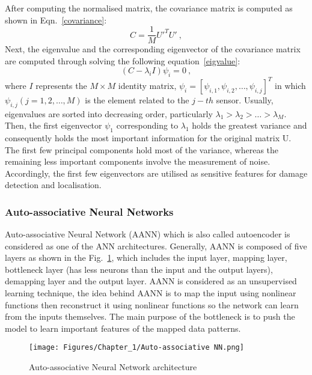 After computing the normalised matrix, the covariance matrix is computed as shown in Eqn.~\ref{covariance}:
\begin{equation}
	C = \frac{1}{M}U'^TU' \ ,
	\label{covariance}
\end{equation}
Next, the eigenvalue and the corresponding eigenvector of the covariance matrix are computed through solving the following equation~\ref{eigvalue}:
\begin{equation}
	(C-\lambda_iI)\psi_i =0 \ ,
	\label{eigvalue}
\end{equation}
where \(I\) represents the \(M\times M\) identity matrix, \(\psi_i = [\psi_{i,1},\psi_{i,2}, \hdots, \psi_{i,j}]^T\) in which \(\psi_{i,j}(j=1, 2, \hdots, M)\) is the element related to the \(j-th\) sensor.
Usually, eigenvalues are sorted into decreasing order, particularly \(\lambda_1>\lambda_2>\hdots>\lambda_M\). 
Then, the first eigenvector \(\psi_1\) corresponding to \(\lambda_1\) holds the greatest variance and consequently holds the most important information for the original matrix U. 
The first few principal components hold most of the variance, whereas the remaining less important components involve the measurement of noise.
Accordingly, the first few eigenvectors are utilised as sensitive features for damage detection and localisation.
\subsubsection{Auto-associative Neural Networks}
Auto-associative Neural Network (AANN) which is also called autoencoder is considered as one of the ANN architectures. 
Generally, AANN is composed of five layers as shown in the Fig.~\ref{fig:AANN}, which includes the input layer, mapping layer, bottleneck layer (has less neurons than the input and the output layers), demapping layer and the output layer. 
AANN is considered as an unsupervised learning technique, the idea behind AANN is to map the input using nonlinear functions then reconstruct it using nonlinear functions so the network can learn from the inputs themselves.
The main purpose of the bottleneck is to push the model to learn important features of the mapped data patterns.
\begin{figure}[!ht]
	\begin{center}
		\centering
		\texttt{[image: Figures/Chapter\_1/Auto-associative NN.png]}
	\end{center}
	\caption{Auto-associative Neural Network architecture} 
	\label{fig:AANN}
\end{figure}
